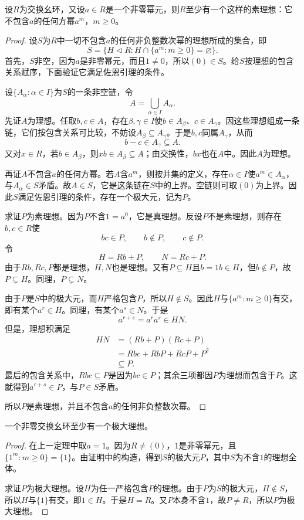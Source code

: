 \begin{theorem}\label{p2:prime-avoid-powers}
设$R$为交换幺环，又设$a\in R$是一个非零幂元，则$R$至少有一个这样的素理想：它不包含$a$的任何方幂$a^m$，$m\ge0$。
\end{theorem}
\begin{proof}
设$S$为$R$中一切不包含$a$的任何非负整数次幂的理想所成的集合，即
\[
S=\{H\lhd R:H\cap\{a^m:m\ge0\}=\varnothing\}.
\]
首先，$S$非空，因为$a$是非零幂元，而且$1\ne0$，所以$(0)\in S$。给$S$按理想的包含关系赋序，下面验证它满足佐恩引理的条件。

设$\{A_\alpha:\alpha\in I\}$为$S$的一条非空链，令
\[
A=\bigcup_{\alpha\in I}A_\alpha.
\]
先证$A$为理想。任取$b,c\in A$，存在$\beta,\gamma\in I$使$b\in A_\beta$、$c\in A_\gamma$。因这些理想组成一条链，它们按包含关系可比较，不妨设$A_\beta\subseteq A_\gamma$。于是$b,c$同属$A_\gamma$，从而
\[
b-c\in A_\gamma\subseteq A.
\]
又对$x\in R$，若$b\in A_\beta$，则$xb\in A_\beta\subseteq A$；由交换性，$bx$也在$A$中。因此$A$为理想。

再证$A$不包含$a$的任何方幂。若$A$含$a^m$，则按并集的定义，存在$\alpha\in I$使$a^m\in A_\alpha$，与$A_\alpha\in S$矛盾。故$A\in S$，它是这条链在$S$中的上界。空链则可取$(0)$为上界。因此$S$满足佐恩引理的条件，存在一个极大元，记为$P$。

求证$P$为素理想。因为$P$不含$1=a^0$，它是真理想。反设$P$不是素理想，则存在$b,c\in R$使
\[
bc\in P,\qquad b\notin P,\qquad c\notin P.
\]
令
\[
H=Rb+P,\qquad N=Rc+P.
\]
由于$Rb,Rc,P$都是理想，$H,N$也是理想。又有$P\subseteq H$且$b=1b\in H$，但$b\notin P$，故$P\subsetneq H$。同理，$P\subsetneq N$。

由于$P$是$S$中的极大元，而$H$严格包含$P$，所以$H\notin S$。因此$H$与$\{a^m:m\ge0\}$有交，即有某个$a^r\in H$。同理，有某个$a^s\in N$。于是
\[
a^{r+s}=a^ra^s\in HN.
\]
但是，理想积满足
\begin{align*}
HN&=(Rb+P)(Rc+P)\\
&=Rbc+RbP+RcP+P^2\\
&\subseteq P.
\end{align*}
最后的包含关系中，$Rbc\subseteq P$是因为$bc\in P$；其余三项都因$P$为理想而包含于$P$。这就得到$a^{r+s}\in P$，与$P\in S$矛盾。

所以$P$是素理想，并且不包含$a$的任何非负整数次幂。
\end{proof}

\begin{corollary}
一个非零交换幺环至少有一个极大理想。
\end{corollary}
\begin{proof}
在上一定理中取$a=1$。因为$R\ne(0)$，$1$是非零幂元，且$\{1^m:m\ge0\}=\{1\}$。由证明中的构造，得到$S$的极大元$P$，其中$S$为不含$1$的理想全体。

求证$P$为极大理想。设$H$为任一严格包含$P$的理想。由于$P$为$S$的极大元，$H\notin S$，所以$H$与$\{1\}$有交，即$1\in H$。于是$H=R$。又$P$本身不含$1$，故$P\ne R$，所以$P$为极大理想。
\end{proof}


